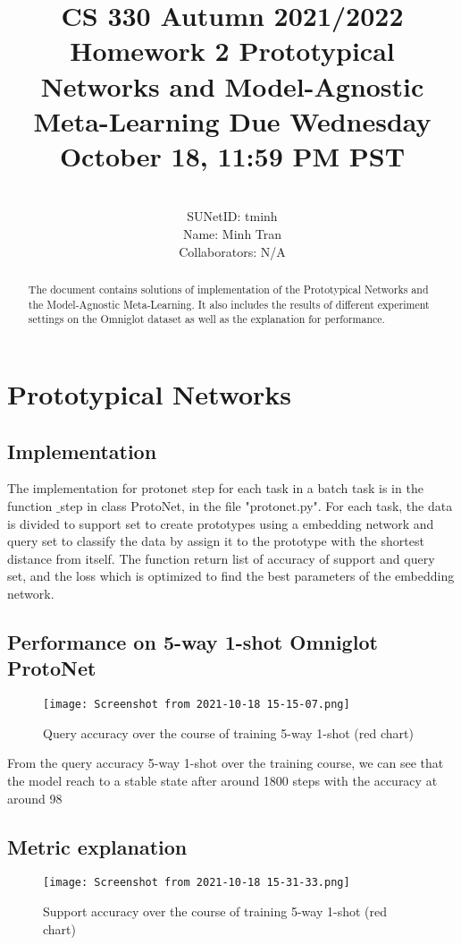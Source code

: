 \documentclass[]{article}
\title{\textbf{CS 330 Autumn 2021/2022 Homework 2}
	{Prototypical Networks and Model-Agnostic Meta-Learning
		Due Wednesday October 18, 11:59 PM PST}}
\author{
			\\SUNetID: tminh 
			\\Name: Minh Tran 
			\\Collaborators: N/A 
		}
\begin{document}
	
	\maketitle
	
	\begin{abstract}
		
		The document contains solutions of implementation of the Prototypical Networks and the Model-Agnostic Meta-Learning. It also includes the results of different experiment settings on the Omniglot dataset as well as the explanation for performance.
		
	\end{abstract}
	
	\section{Prototypical Networks}
	\subsection{Implementation}
	The implementation for protonet step for each task in a batch task is in the function $\_$step in class ProtoNet, in the file "protonet.py". For each task, the data is divided to support set to create prototypes using a embedding network and query set to classify the data by assign it to the prototype with the shortest distance from itself. The function return list of accuracy of support and query set, and the loss which is optimized to find the best parameters of the embedding network.
	
	\subsection{Performance on 5-way 1-shot Omniglot ProtoNet}
	\begin{center} 
		\begin{figure}[H]
			\centering
			\texttt{[image: Screenshot from 2021-10-18 15-15-07.png]}
			\caption{Query accuracy over the course of training 5-way 1-shot (red chart)}
		\end{figure}
	\end{center}
	From the query accuracy 5-way 1-shot over the training course, we can see that the model reach to a stable state after around 1800 steps with the accuracy at around 98%
	
	\subsection{Metric explanation}
	\begin{center} 
		\begin{figure}[H]
			\centering
			\texttt{[image: Screenshot from 2021-10-18 15-31-33.png]}
			\caption{Support accuracy over the course of training 5-way 1-shot (red chart)}
		\end{figure}
	\end{center}
	
\end{document}
